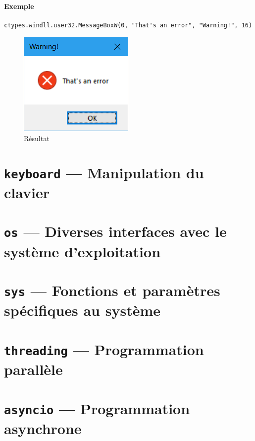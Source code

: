 \documentclass[a4paper, 10pt]{article}
\begin{document}
\paragraph{Exemple}
\begin{verbatim}
ctypes.windll.user32.MessageBoxW(0, "That's an error", "Warning!", 16)
\end{verbatim}
\begin{figure}[h]
	\begin{center}
		\includegraphics[scale=0.5]{errorwindow.png}
		\caption*{Résultat}
	\end{center}
\end{figure}

\section{\texttt{keyboard} --- Manipulation du clavier}

\section{\texttt{os} --- Diverses interfaces avec le système d'exploitation}

\section{\texttt{sys} --- Fonctions et paramètres spécifiques au système}

\section{\texttt{threading} --- Programmation parallèle}

\section{\texttt{asyncio} --- Programmation asynchrone}
\end{document}

